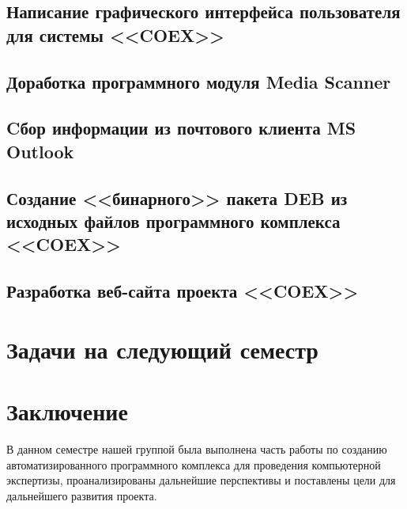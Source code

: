 \newpage
\subsection{ Написание графического интерфейса пользователя для системы <<COEX>> }
%
\newpage
\subsection{ Доработка программного модуля Media Scanner }
%
 
\newpage
\subsection{ Cбор информации из почтового клиента MS Outlook }

\newpage
\subsection { Создание <<бинарного>> пакета DEB из исходных файлов программного комплекса <<COEX>> } 


\newpage 
\subsection{ Разработка веб-сайта проекта <<COEX>> }




% 
%

\newpage
\section{Задачи на следующий семестр}


\newpage
\section*{Заключение}
В данном семестре нашей группой была выполнена часть работы по созданию автоматизированного программного комплекса для проведения компьютерной экспертизы, проанализированы дальнейшие перспективы и поставлены цели для дальнейшего развития проекта.
 
